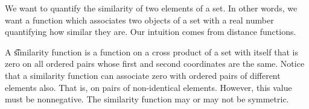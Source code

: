 

We want to quantify the similarity of two elements of a set.
In other words, we want a function which associates two objects of a set with a real number quantifying how similar they are.
Our intuition comes from distance functions.


A \t{similarity function} is a function on a cross product of a set with itself that is zero on all ordered pairs whose first and second coordinates are the same.
Notice that a similarity function can associate zero with ordered pairs of different elements also.
That is, on pairs of non-identical elements.
However, this value must be nonnegative.
The similarity function may or may not be symmetric.

\blankpage
